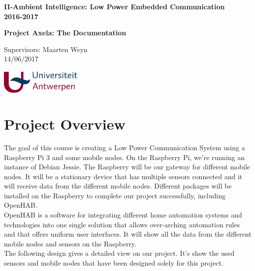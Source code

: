 \documentclass[a4paper,notitlepage]{article}
\begin{document}
\begin{titlepage}
    \centering
    \vfill
    {\bfseries\Large
        II-Ambient Intelligence: Low Power Embedded Communication\\2016-2017\\
        
    } 
    
    \hrulefill
    \vskip4cm
    
    {\bfseries\large
            Project Axela: The Documentation\\
            \vskip2cm         
    }   
    {\bfseries   
            
            Supervisors: Maarten Weyn\\
           	14/06/2017   
            
            
            
            
    } 
    
    \vfill
    \includegraphics[width=4cm]{images/logo_UA_hor_kl_PMS.pdf}     
\end{titlepage}

\tableofcontents
\vfill
\newpage


\section*{Project Overview}

The goal of this course is creating a Low Power Communication System using a Raspberry Pi 3 and some mobile nodes. On the Raspberry Pi, we're running an instance of Debian Jessie. The Raspberry will be our gateway for different mobile nodes. It will be a stationary device that has multiple sensors connected and it will receive data from the different mobile nodes. Different packages will be installed on the Raspberry to complete our project successfully, including OpenHAB.\\

OpenHAB is a software for integrating different home automation systems and technologies into one single solution that allows over-arching automation rules and that offers uniform user interfaces. It will show all the data from the different mobile nodes and sensors on the Raspberry.\\

The following design gives a detailed view on our project. It's show the used sensors and mobile nodes that have been designed solely for this project.
\end{document}
